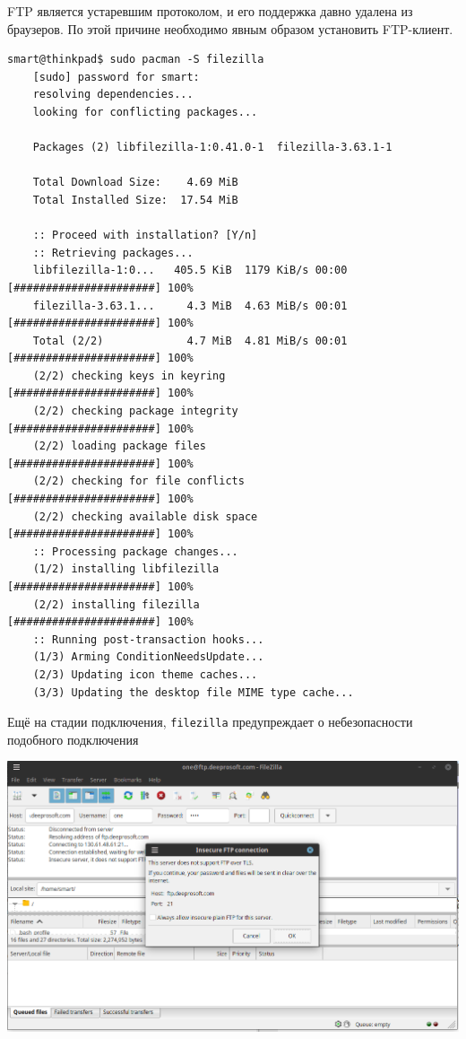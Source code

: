FTP является устаревшим протоколом, и его поддержка давно удалена из браузеров. По этой причине необходимо явным образом установить FTP-клиент.
\begin{Verbatim}[frame=single,breaklines=true,breakanywhere=true]
    smart@thinkpad$ sudo pacman -S filezilla
    [sudo] password for smart: 
    resolving dependencies...
    looking for conflicting packages...

    Packages (2) libfilezilla-1:0.41.0-1  filezilla-3.63.1-1

    Total Download Size:    4.69 MiB
    Total Installed Size:  17.54 MiB

    :: Proceed with installation? [Y/n] 
    :: Retrieving packages...
    libfilezilla-1:0...   405.5 KiB  1179 KiB/s 00:00 [######################] 100%
    filezilla-3.63.1...     4.3 MiB  4.63 MiB/s 00:01 [######################] 100%
    Total (2/2)             4.7 MiB  4.81 MiB/s 00:01 [######################] 100%
    (2/2) checking keys in keyring                     [######################] 100%
    (2/2) checking package integrity                   [######################] 100%
    (2/2) loading package files                        [######################] 100%
    (2/2) checking for file conflicts                  [######################] 100%
    (2/2) checking available disk space                [######################] 100%
    :: Processing package changes...
    (1/2) installing libfilezilla                      [######################] 100%
    (2/2) installing filezilla                         [######################] 100%
    :: Running post-transaction hooks...
    (1/3) Arming ConditionNeedsUpdate...
    (2/3) Updating icon theme caches...
    (3/3) Updating the desktop file MIME type cache...
\end{Verbatim}

Ещё на стадии подключения, \texttt{filezilla} предупреждает о небезопасности подобного подключения
\begin{center}
    \includegraphics[scale=0.5]{res/5.filezilla-warning.png}
\end{center}

